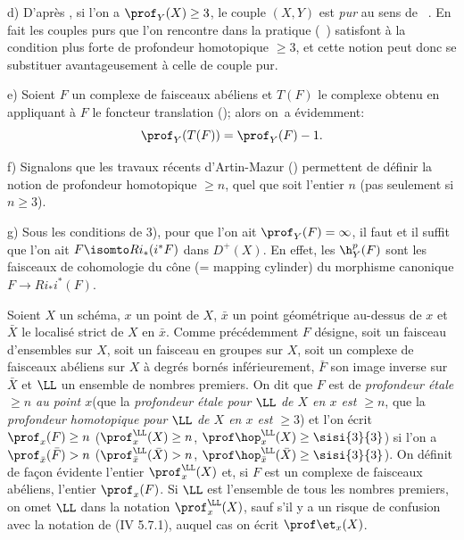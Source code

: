 \begin{remarques}
d) D'apr\`es , si l'on a $\prof_Y(X)\geq 3$, le couple $(X, Y)$ est \textit{pur} au sens de ~. En fait les couples purs que l'on rencontre dans la pratique (\cf {}~) satisfont \`a la condition plus forte de profondeur homotopique $\geq 3$, et cette notion peut donc se substituer avantageusement \`a celle de couple pur.

e) Soient $F$ un complexe de faisceaux ab\'eliens et $T(F)$ le complexe obtenu en appliquant \`a $F$ le foncteur translation (\cite{XIV.3}); alors on~a \'evidemment:
$$
\prof_Y(T(F))=\prof_Y(F)-1.
$$

f) Signalons que les travaux r\'ecents d'Artin-Mazur (\cite{XIV.1}) permettent de d\'efinir la notion de profondeur homotopique $\geq n$, quel que soit l'entier $n$ (pas seulement si $n\geq 3$).

g) Sous les conditions de  3), pour que l'on ait $\prof_Y(F)=\infty$, il faut et il suffit que l'on ait $F\isomto Ri_*(i^*F)$ dans $D^+(X)$. En effet, les ${\h}_Y^p(F)$ sont les faisceaux de cohomologie du c\^{o}ne (= mapping cylinder) du morphisme canonique $F\to Ri_*i^*(F)$.
\end{remarques}

\begin{definition} \label{XIV.1.7}
Soient $X$ un sch\'ema, $x$ un point de $X$, $\bar x$ un point g\'eom\'etrique au-dessus de $x$ et $\bar X$ le localis\'e strict de $X$ en $\bar x$. Comme pr\'ec\'edemment $F$ d\'esigne, soit un faisceau d'ensembles sur $X$, soit un faisceau en groupes sur $X$, soit un complexe de faisceaux ab\'eliens sur $X$ \`a degr\'es born\'es inf\'erieurement, $\bar F$ son image inverse sur~$\bar X$ et $\LL$ un ensemble de nombres premiers. On dit que $F$ est de \emph{profondeur \'etale $\geq n$ au point $x$}\pageoriginale (\resp que la \emph{profondeur \'etale pour $\LL$ de $X$ en $x$ est $\geq n$}, \resp que la \emph{profondeur homotopique pour $\LL$ de $X$ en $x$ est $\geq 3$}) et l'on \'ecrit $\prof_x(F)\geq n$ (\resp $\prof_x^{\LL}(X)\geq n$, \resp $\prof \hop_x^{\LL}(X)\geq \sisi{3}{3}$) si l'on a $\prof_{\bar x}(\bar F)>n$ (\resp $\prof_{\bar x}^{\LL}(\bar X)>\nobreak n$, \resp $\prof \hop_{\bar x}^{\LL}(\bar X)\geq \sisi{3}{3}$). On d\'efinit de fa\c con \'evidente l'entier $\prof_x^{\LL}(X)$ et, si $F$ est un complexe de faisceaux ab\'eliens, l'entier $\prof_x(F)$. Si $\LL$ est l'ensemble de tous les nombres premiers, on omet $\LL$ dans la notation $\prof_x^{\LL}(X)$, sauf s'il y a un risque de confusion avec la notation de \textup{(\EGA IV 5.7.1)}, auquel cas on \'ecrit $\prof \et_x(X)$.
\end{definition}

